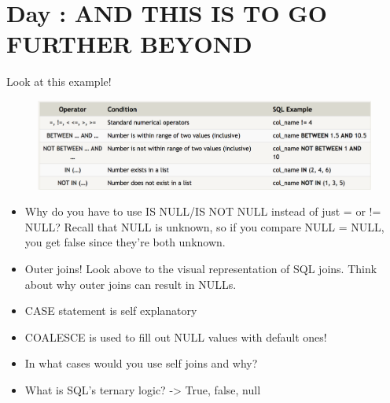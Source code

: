 \documentclass{42-en}
\begin{document}

\chapter{Day \exercicenumber: AND THIS IS TO GO FURTHER BEYOND }

\makeheaderfiles

	Look at this example! \\
    
            \begin{figure}[H]
                \begin{center}
                    \includegraphics[width=14cm]{operators.png}
                \end{center}
            \end{figure}

	\begin{itemize}\itemsep1pt 
		\item Why do you have to use IS NULL/IS NOT NULL instead of just = or != NULL? 
			Recall that NULL is unknown, so if you compare NULL = NULL, you get false 
			since they're both unknown. 
		\item Outer joins! Look above to the visual representation of SQL joins. Think about 
			why outer joins can result in NULLs. 
		\item CASE statement is self explanatory
		\item COALESCE is used to fill out NULL values with default ones!   
		\item In what cases would you use self joins and why?  
		\item What is SQL's ternary logic? -> True, false, null
	\end{itemize}
\end{document}
